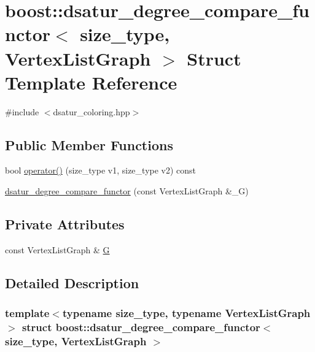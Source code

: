 \hypertarget{structboost_1_1dsatur__degree__compare__functor}{}\section{boost\+:\+:dsatur\+\_\+degree\+\_\+compare\+\_\+functor$<$ size\+\_\+type, Vertex\+List\+Graph $>$ Struct Template Reference}
\label{structboost_1_1dsatur__degree__compare__functor}


{\ttfamily \#include $<$dsatur\+\_\+coloring.\+hpp$>$}

\subsection*{Public Member Functions}
\begin{DoxyCompactItemize}
\item 
bool \hyperlink{structboost_1_1dsatur__degree__compare__functor_abcdd1bd7901680e80d5b37814ca05efa}{operator()} (size\+\_\+type v1, size\+\_\+type v2) const
\item 
\hyperlink{structboost_1_1dsatur__degree__compare__functor_ad161298fc0f4ee64a44be0a54fa7c92c}{dsatur\+\_\+degree\+\_\+compare\+\_\+functor} (const Vertex\+List\+Graph \&\+\_\+G)
\end{DoxyCompactItemize}
\subsection*{Private Attributes}
\begin{DoxyCompactItemize}
\item 
const Vertex\+List\+Graph \& \hyperlink{structboost_1_1dsatur__degree__compare__functor_ae524796a59fa34ed459bc7cdadfe3e2e}{G}
\end{DoxyCompactItemize}


\subsection{Detailed Description}
\subsubsection*{template$<$typename size\+\_\+type, typename Vertex\+List\+Graph$>$\newline
struct boost\+::dsatur\+\_\+degree\+\_\+compare\+\_\+functor$<$ size\+\_\+type, Vertex\+List\+Graph $>$}



